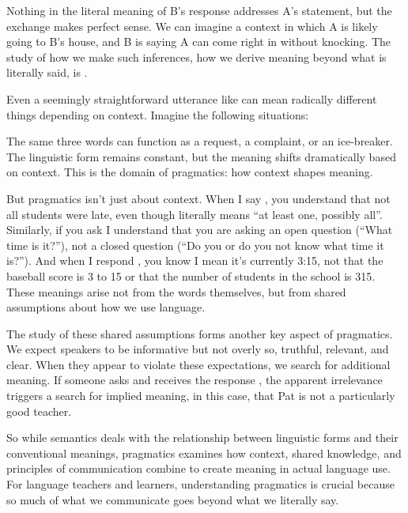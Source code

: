 Nothing in the literal meaning of B's response addresses A's statement, but the exchange makes perfect sense. We can imagine a context in which A is likely going to B's house, and B is saying A can come right in without knocking. The study of how we make such inferences, how we derive meaning beyond what is literally said, is .

Even a seemingly straightforward utterance like  can mean radically different things depending on context. Imagine the following situations:

\ea
    \z
\z
The same three words can function as a request, a complaint, or an ice-breaker. The linguistic form remains constant, but the meaning shifts dramatically based on context. This is the domain of pragmatics: how context shapes meaning.

But pragmatics isn't just about context. When I say , you understand that not all students were late, even though  literally means \enquote{at least one, possibly all}. Similarly, if you ask  I understand that you are asking an open question (\enquote{What time is it?}), not a closed question (\enquote{Do you or do you not know what time it is?}). And when I respond , you know I mean it's currently 3:15, not that the baseball score is 3 to 15 or that the number of students in the school is 315. These meanings arise not from the words themselves, but from shared assumptions about how we use language.

The study of these shared assumptions forms another key aspect of pragmatics. We expect speakers to be informative but not overly so, truthful, relevant, and clear. When they appear to violate these expectations, we search for additional meaning. If someone asks  and receives the response , the apparent irrelevance triggers a search for implied meaning, in this case, that Pat is not a particularly good teacher.

So while semantics deals with the relationship between linguistic forms and their conventional meanings, pragmatics examines how context, shared knowledge, and principles of communication combine to create meaning in actual language use. For language teachers and learners, understanding pragmatics is crucial because so much of what we communicate goes beyond what we literally say.

